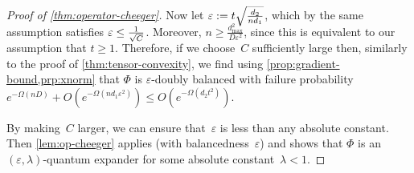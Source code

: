 \documentclass[aos]{imsart}
\theoremstyle{definition}
\numberwithin{equation}{section}
\newcommand{\eps}{\varepsilon}
\def\dmax{d_{\max}}
\begin{document}
\begin{appendix}
\begin{proof}[Proof of \cref{thm:operator-cheeger}]
Now let $\eps := \smash{t \sqrt{\frac{d_2}{n d_1}}}$, which by the same assumption satisfies $\eps \leq \smash{\frac1{\sqrt C}}$.
Moreover, $n \geq \frac {\dmax^2} {D \eps^2}$, since this is equivalent to our assumption that $t\geq1$.
Therefore, if we choose~$C$ sufficiently large then, similarly to the proof of \cref{thm:tensor-convexity}, we find using \cref{prop:gradient-bound,prp:xnorm} that $\Phi$ is $\eps$-doubly balanced with failure probability $e^{-\Omega(nD)} + O(e^{-\Omega(n d_1 \eps^2)}) \leq O(e^{-\Omega(d_2 t^2)})$.

By making~$C$ larger, we can ensure that~$\eps$ is less than any absolute constant.
Then \cref{lem:op-cheeger} applies (with balancedness~$\eps$) and shows that $\Phi$ is an $(\eps,\lambda)$-quantum expander for some absolute constant~$\lambda<1$.
\end{proof}


\end{appendix}
\end{document}
